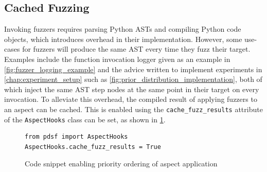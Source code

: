 \subsection{Cached Fuzzing}

Invoking fuzzers requires parsing Python ASTs and compiling Python code objects,
which introduces overhead in their implementation. However, some use-cases for
fuzzers will produce the same AST every time they fuzz their target. Examples
include the function invocation logger given as an example in
\cref{fig:fuzzer_logging_example} and the advice written to implement
experiments in \cref{chap:experiment_setup} such as
\cref{fig:prior_distribution_implementation}, both of which inject the same AST
step nodes at the same point in their target on every invocation. To alleviate
this overhead, the compiled result of applying fuzzers to an aspect can be
cached. This is enabled using the \lstinline{cache_fuzz_results} attribute of
the \lstinline{AspectHooks} class can be set, as shown in
\cref{fig:enabling_fuzzer_caching}.

\begin{figure}[h]
    \begin{lstlisting}[style=footnotesize_python]
from pdsf import AspectHooks
AspectHooks.cache_fuzz_results = True
    \end{lstlisting}
    \caption{Code snippet enabling priority ordering of aspect application}
    \label{fig:enabling_fuzzer_caching}
\end{figure}


